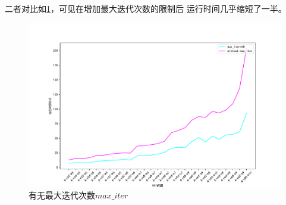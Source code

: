 \documentclass{nudt}
\begin{document}
二者对比如\cref{fig:withorno_max_iter}，可见在增加最大迭代次数的限制后
运行时间几乎缩短了一半。
\begin{figure}[H]
	\centering
	\includegraphics[height = 0.45\linewidth]{image/time_contrast.pdf}
	\caption{有无最大迭代次数$max\_iter$}
	\label{fig:withorno_max_iter}
\end{figure}
\end{document}
